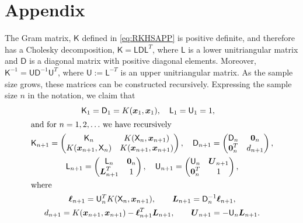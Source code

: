 \documentclass[]{mcom-l}
\theoremstyle{remark}
\newcommand{\mD}{\mathsf{D}}
\newcommand{\mK}{\mathsf{K}}
\newcommand{\mL}{\mathsf{L}}
\newcommand{\mU}{\mathsf{U}}
\newcommand{\mX}{\mathsf{X}}
\newcommand{\bzero}{\boldsymbol{0}}
\newcommand{\bx}{{\boldsymbol{x}}}
\newcommand{\vell}{{\boldsymbol{\ell}}}
\newcommand{\bL}{{\boldsymbol{L}}}
\newcommand{\bU}{{\boldsymbol{U}}}
\begin{document}
\section*{Appendix}
The Gram matrix, $\mK$ defined in \eqref{eq:RKHSAPP} is positive definite, and therefore has a Cholesky decomposition, $\mK = \mL \mD \mL^T$, where $\mL$ is a lower unitriangular matrix and $\mD$ is a diagonal matrix with positive diagonal elements.  Moreover, $\mK^{-1} = \mU \mD^{-1} \mU^T$, where $\mU := \mL^{-T}$ is an upper unitriangular matrix. As the sample size grows, these matrices can be constructed recursively.  Expressing the sample size $n$ in the notation, we claim that 
\begin{subequations} \label{eq:cholrecurse}
\begin{gather}
\label{eq:cholrecurseA}
\mK_1  = \mD_1 = K(\bx_1,\bx_1), \quad \mL_1 = \mU_1 = 1,  \quad \\
\intertext{and for $n = 1, 2, \ldots$ we have recursively}
\label{eq:cholrecurseB}\mK_{n+1} = \begin{pmatrix}
\mK_n & K(\mX_n, \bx_{n+1}) \\
K(\bx_{n+1}, \mX_n) & K(\bx_{n+1}, \bx_{n+1})
\end{pmatrix},
\quad 
\mD_{n+1} = \begin{pmatrix}
\mD_n & \bzero_n \\
\bzero_n^T & d_{n+1}
\end{pmatrix},
\\
\label{eq:cholrecurseC}
\mL_{n+1} = \begin{pmatrix}
\mL_n & \bzero_n \\
\bL_{n+1}^T  & 1
\end{pmatrix},
\quad 
\mU_{n+1} = \begin{pmatrix}
\mU_n & \bU_{n+1} \\
\bzero_n^T  & 1
\end{pmatrix}, \\
\intertext{where}
\label{eq:cholrecurseD}
\vell_{n+1} = \mU_n^T K(\mX_n, \bx_{n+1}), \qquad
\bL_{n+1} = \mD_n^{-1} \vell_{n+1}, 
\\
\label{eq:cholrecurseE}
d_{n+1} = K(\bx_{n+1}, \bx_{n+1}) - \vell^T_{n+1} \bL_{n+1}, \qquad
\bU_{n+1} = - \mU_n \bL_{n+1}.
\end{gather}
\end{subequations}
\end{document}
